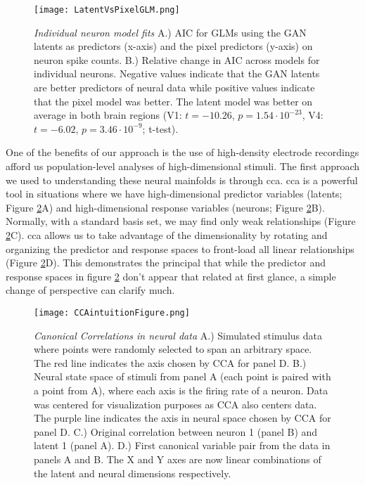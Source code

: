 \begin{figure}
	\centering
	\texttt{[image: LatentVsPixelGLM.png]}
	{\caption{{\it Individual neuron model fits} A.) AIC for GLMs using the GAN latents as predictors (x-axis) and the pixel predictors (y-axis) on neuron spike counts. B.) Relative change in AIC across models for individual neurons. Negative values indicate that the GAN latents are better predictors of neural data while positive values indicate that the pixel model was better. The latent model was better on average in both brain regions (V1: $t=-10.26$, $p=1.54 \cdot 10^{-23}$, V4: $t=-6.02$, $p=3.46\cdot 10^{-9}$; t-test).}
	\label{fig:modelAICs}}
\end{figure}

One of the benefits of our approach is the use of high-density electrode recordings afford us population-level analyses of high-dimensional stimuli. The first approach we used to understanding these neural mainfolds is through \gls{cca}. \gls{cca} is a powerful tool in situations where we have high-dimensional predictor variables (latents; Figure \ref{fig:ccaIntuition}A) and high-dimensional response variables (neurons; Figure \ref{fig:ccaIntuition}B). Normally, with a standard basis set, we may find only weak relationships (Figure \ref{fig:ccaIntuition}C). \gls{cca} allows us to take advantage of the dimensionality by rotating and organizing the predictor and response spaces to front-load all linear relationships (Figure \ref{fig:ccaIntuition}D). This demonstrates the principal that while the predictor and response spaces in figure \ref{fig:ccaIntuition} don't appear that related at first glance, a simple change of perspective can clarify much.

\begin{figure}
	\centering
	\texttt{[image: CCAintuitionFigure.png]}
	{\caption{{\it Canonical Correlations in neural data} A.) Simulated stimulus data where points were randomly selected to span an arbitrary space. The red line indicates the axis chosen by CCA for panel D. B.) Neural state space of stimuli from panel A (each point is paired with a point from A), where each axis is the firing rate of a neuron. Data was centered for visualization purposes as CCA also centers data. The purple line indicates the axis in neural space chosen by CCA for panel D. C.) Original correlation between neuron 1 (panel B) and latent 1 (panel A). D.) First canonical variable pair from the data in panels A and B. The X and Y axes are now linear combinations of the latent and neural dimensions respectively. }
	\label{fig:ccaIntuition}}
\end{figure}

